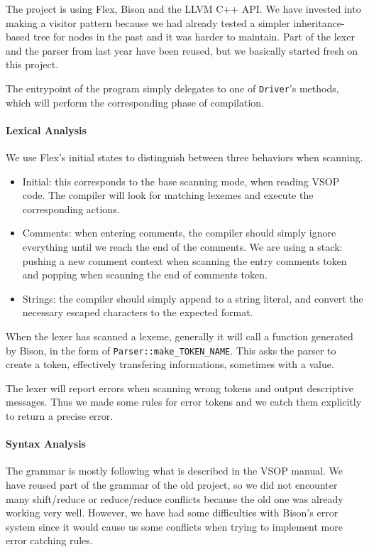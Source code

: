 \documentclass{article}
\begin{document}
The project is using Flex, Bison and the LLVM C++ API. We have invested into making a visitor pattern because we had already tested a simpler inheritance-based tree for nodes in the past and it was harder to maintain. Part of the lexer and the parser from last year have been reused, but we basically started fresh on this project.

The entrypoint of the program simply delegates to one of \texttt{Driver}'s methods, which will perform the corresponding phase of compilation.

\paragraph{Lexical Analysis}
We use Flex's initial states to distinguish between three behaviors when scanning. 

\begin{itemize}
    \item Initial: this corresponds to the base scanning mode, when reading VSOP code. The compiler will look for matching lexemes and execute the corresponding actions.
    \item Comments: when entering comments, the compiler should simply ignore everything until we reach the end of the comments. We are using a stack: pushing a new comment context when scanning the entry comments token and popping when scanning the end of comments token.
    \item Strings: the compiler should simply append to a string literal, and convert the necessary escaped characters to the expected format.
\end{itemize}

When the lexer has scanned a lexeme, generally it will call a function generated by Bison, in the form of \texttt{Parser::make\_TOKEN\_NAME}. This asks the parser to create a token, effectively transfering informations, sometimes with a value.

The lexer will report errors when scanning wrong tokens and output descriptive messages. Thus we made some rules for error tokens and we catch them explicitly to return a precise error.

\paragraph{Syntax Analysis}

The grammar is mostly following what is described in the VSOP manual.
We have reused part of the grammar of the old project, so we did not encounter many shift/reduce or reduce/reduce conflicts because the old one was already working very well. However, we have had some difficulties with Bison's error system since it would cause us some conflicts when trying to implement more error catching rules. 
\end{document}
